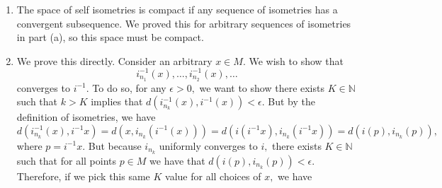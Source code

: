 \documentclass{article}
\numberwithin{equation}{section}
\begin{document}
\begin{enumerate}
\begin{enumerate}[label=(\alph*)]
        We prove this by contradiction. Suppose for the sake of contradiction that 
        \begin{equation}
            |d(i(p),i(q)) - d(p,q)| = \epsilon > 0.
        \end{equation}
        However, by triangle inequality:
        \begin{equation}
            d(i(p), i(q)) \le d(i(p), i_{n_k}(p)) + d(i_{n_k}(p), i_{n_k}(q)) + d(i_{n_k}(q), i(q)) = d(i(p), i_{n_k}(p)) + d(i_{n_k}(q), i(q)) + d(p,q),
        \end{equation}
        so 
        \begin{equation}
            d(i(p), i(q)) - d(p,q) \le d(i(p), i_{n_k}(p)) + d(i_{n_k}(q), i(q)).
        \end{equation}
        However, since $i_{n_k}(p)\to i(p)$ and $i_{n_k}(q) \to i(q),$ there exists some $N$ such that $k>N$ implies that $d(i(p), i_{n_k}(p)) <\epsilon /2$ and $d(i_{n_k}(q), i(q)) <\epsilon/2.$ So we have:
        \begin{equation}
            |d(i(p),i(q)) - d(p,q)| < \epsilon,
        \end{equation}
        contradicting the assumption that $|d(i(p),i(q)) - d(p,q)| = \epsilon.$ Therefore, the sequence of isometries converges to an isometry.
        \item The space of self isometries is compact if any sequence of isometries has a convergent subsequence. We proved this for arbitrary sequences of isometries in part (a), so this space must be compact.
        \item  We prove this directly. Consider an arbitrary $x\in M.$ We wish to show that 
        \begin{equation}
            i_{n_1}^{-1}(x),\dots, i_{n_2}^{-1}(x), \dots
        \end{equation}
        converges to $i^{-1}.$ To do so, for any $\epsilon > 0,$ we want to show there exists $K \in \mathbb{N}$ such that $k>K$ implies that $d(i_{n_k}^{-1}(x),i^{-1}(x)) < \epsilon.$ But by the definition of isometries, we have 
        \begin{equation}
            d(i_{n_k}^{-1}(x),i^{-1}x) = d(x, i_{n_k}(i^{-1}(x))) = d(i(i^{-1}x), i_{n_k}(i^{-1}x)) = d(i(p), i_{n_k}(p)),
        \end{equation}
        where $p=i^{-1}x.$ But because $i_{n_k}$ uniformly converges to $i,$ there exists $K\in \mathbb{N}$ such that for all points $p\in M$ we have that $d(i(p), i_{n_k}(p)) < \epsilon.$ Therefore, if we pick this same $K$ value for all choices of $x,$ we have 

\end{enumerate}
\end{enumerate}
\end{document}
